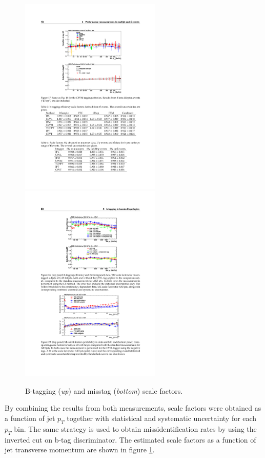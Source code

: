 \begin{figure}
\centering
\includegraphics[width=0.6\textwidth]{Figures/b-tagSF.pdf}
\includegraphics[width=0.6\textwidth]{Figures/miss-tag.pdf}
\caption{B-tagging (\textit{up}) and misstag (\textit{bottom}) scale factors. \cite{CMS:2013vea}}
\label{fig:nesto}
\end{figure}
By combining the results from both measurements, scale factors were obtained as a function of jet $p_T$ together with statistical and systematic uncertainty for each $p_T$ bin. The same strategy is used to obtain missidentification rates by using the inverted cut on b-tag discriminator. The estimated scale factors as a function of jet transverse momentum are shown in figure \ref{fig:nesto}.  
